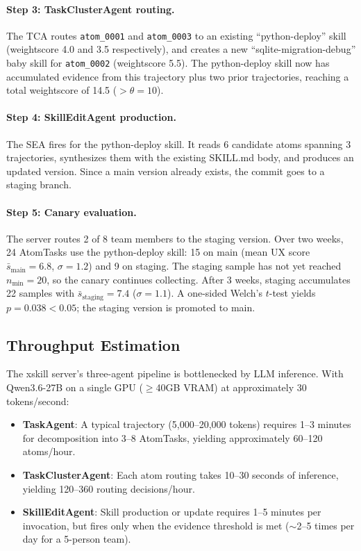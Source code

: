 \documentclass[11pt]{article}
\begin{document}
\paragraph{Step 3: TaskClusterAgent routing.} The TCA routes \texttt{atom\_0001} and \texttt{atom\_0003} to an existing ``python-deploy'' skill (weightscore 4.0 and 3.5 respectively), and creates a new ``sqlite-migration-debug'' baby skill for \texttt{atom\_0002} (weightscore 5.5). The python-deploy skill now has accumulated evidence from this trajectory plus two prior trajectories, reaching a total weightscore of 14.5 ($> \theta = 10$).

\paragraph{Step 4: SkillEditAgent production.} The SEA fires for the python-deploy skill. It reads 6 candidate atoms spanning 3 trajectories, synthesizes them with the existing SKILL.md body, and produces an updated version. Since a main version already exists, the commit goes to a staging branch.

\paragraph{Step 5: Canary evaluation.} The server routes 2 of 8 team members to the staging version. Over two weeks, 24 AtomTasks use the python-deploy skill: 15 on main (mean UX score $\bar{s}_{\mathrm{main}} = 6.8$, $\sigma = 1.2$) and 9 on staging. The staging sample has not yet reached $n_{\min} = 20$, so the canary continues collecting. After 3 weeks, staging accumulates 22 samples with $\bar{s}_{\mathrm{staging}} = 7.4$ ($\sigma = 1.1$). A one-sided Welch's $t$-test yields $p = 0.038 < 0.05$; the staging version is promoted to main.

\subsection{Throughput Estimation}

The xskill server's three-agent pipeline is bottlenecked by LLM inference. With Qwen3.6-27B on a single GPU ($\geq$40GB VRAM) at approximately 30 tokens/second:
\begin{itemize}
    \item \textbf{TaskAgent}: A typical trajectory (5,000--20,000 tokens) requires 1--3 minutes for decomposition into 3--8 AtomTasks, yielding approximately 60--120 atoms/hour.
    \item \textbf{TaskClusterAgent}: Each atom routing takes 10--30 seconds of inference, yielding 120--360 routing decisions/hour.
    \item \textbf{SkillEditAgent}: Skill production or update requires 1--5 minutes per invocation, but fires only when the evidence threshold is met ($\sim$2--5 times per day for a 5-person team).
\end{itemize}
\end{document}

